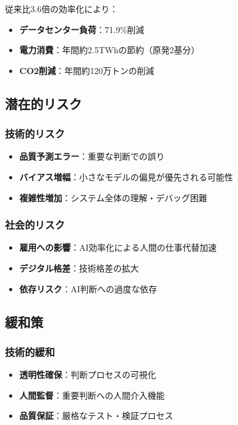 \documentclass[a4paper,12pt]{jsarticle}
\begin{document}
従来比3.6倍の効率化により：

\begin{itemize}
\item \textbf{データセンター負荷}：71.9\%削減
\item \textbf{電力消費}：年間約2.5TWhの節約（原発2基分）
\item \textbf{CO2削減}：年間約120万トンの削減
\end{itemize}

\subsection{潜在的リスク}

\subsubsection{技術的リスク}

\begin{itemize}
\item \textbf{品質予測エラー}：重要な判断での誤り
\item \textbf{バイアス増幅}：小さなモデルの偏見が優先される可能性
\item \textbf{複雑性増加}：システム全体の理解・デバッグ困難
\end{itemize}

\subsubsection{社会的リスク}

\begin{itemize}
\item \textbf{雇用への影響}：AI効率化による人間の仕事代替加速
\item \textbf{デジタル格差}：技術格差の拡大
\item \textbf{依存リスク}：AI判断への過度な依存
\end{itemize}

\subsection{緩和策}

\subsubsection{技術的緩和}

\begin{itemize}
\item \textbf{透明性確保}：判断プロセスの可視化
\item \textbf{人間監督}：重要判断への人間介入機能
\item \textbf{品質保証}：厳格なテスト・検証プロセス
\end{itemize}
\end{document}
